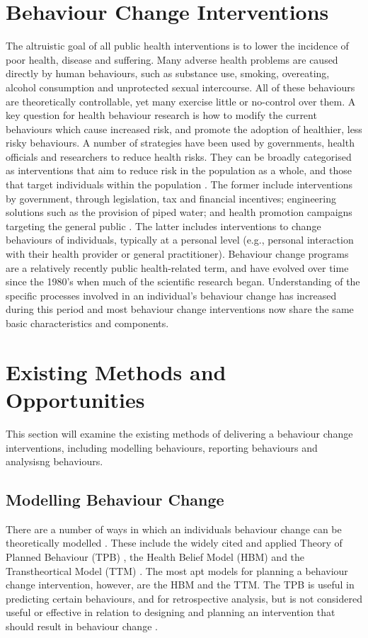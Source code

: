 \section{Behaviour Change Interventions}
The altruistic goal of all public health interventions is to lower the incidence of poor health, disease and suffering. Many adverse health problems are caused directly by human behaviours, such as substance use, smoking, overeating, alcohol consumption and unprotected sexual intercourse. All of these behaviours are theoretically controllable, yet many exercise little or no-control over them. A key question for health behaviour research is how to modify the current behaviours which cause increased risk, and promote the adoption of healthier, less risky behaviours.
A number of strategies have been used by governments, health officials and researchers to reduce health risks. They can be broadly categorised as interventions that aim to reduce risk in the population as a whole, and those that target individuals within the population \cite{Guilbert2003}. The former include interventions by government, through legislation, tax and financial incentives; engineering solutions such as the provision of piped water; and health promotion campaigns targeting the general public \cite{Guilbert2003}. The latter includes interventions to change behaviours of individuals, typically at a personal level (e.g., personal interaction with their health provider or general practitioner).
Behaviour change programs are a relatively recently public health-related term, and have evolved over time since the 1980's when much of the scientific research began. Understanding of the specific processes involved in an individual's behaviour change has increased during this period and most behaviour change interventions now share the same basic characteristics and components.

\section{Existing Methods and Opportunities}
This section will examine the existing methods of delivering a behaviour change interventions, including modelling behaviours, reporting behaviours and analysisng behaviours.

\subsection{Modelling Behaviour Change}
There are a number of ways in which an individuals behaviour change can be theoretically modelled \cite{Morris2012a}. These include the widely cited and applied Theory of Planned Behaviour (TPB) \cite{Ajzen1985}, the Health Belief Model (HBM) \cite{Hochbaum1958, Sharma2012} and the Transtheortical Model (TTM) \cite{Prochaska2005, Prochaska2013}. The most apt models for planning a behaviour change intervention, however, are the HBM and the TTM. The TPB is useful in predicting certain behaviours, and for retrospective analysis, but is not considered useful or effective in relation to designing and planning an intervention that should result in behaviour change \cite{Hardeman2002}.

